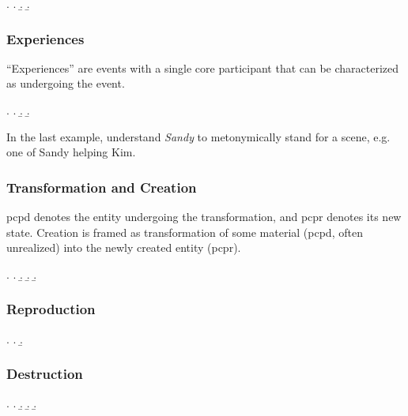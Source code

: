 \documentclass[a4paper]{article}
\begin{document}
\ex. \a. 
     \b. 
     \b. 

\subsubsection{Experiences}

``Experiences'' are events with a single core participant that can be
characterized as undergoing the event.

\ex. \a. 
     \b. 
     \b. 

In the last example, understand \emph{Sandy} to metonymically stand for a scene,
e.g. one of Sandy helping Kim.

\subsubsection{Transformation and Creation}

\textsf{pcpd} denotes the entity undergoing the transformation, and
\textsf{pcpr} denotes its new state. Creation is framed as transformation of
some material (\textsf{pcpd}, often unrealized) into the newly created entity
(\textsf{pcpr}).

\ex. \a. 
     \b. 
     \b. 
     \b. 

\subsubsection{Reproduction}

\ex. \a. 
     \b. 

\subsubsection{Destruction}

\ex. \a. 
     \b. 
     \b. 
     \b. 

%
%
\end{document}
